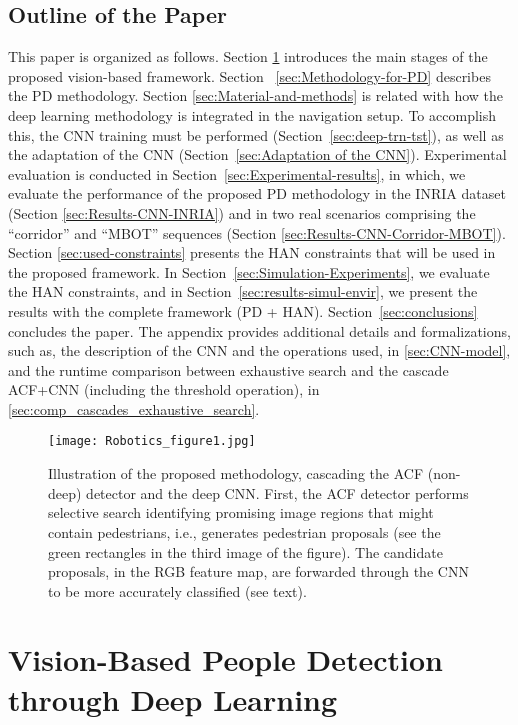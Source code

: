 \documentclass[5p,time]{elsarticle}
\begin{document}
\subsection{Outline of the Paper}

This paper is organized as follows. Section \ref{sec:localization} introduces the main stages of the proposed vision-based framework. Section ~\ref{sec:Methodology-for-PD} describes the PD methodology. Section \ref{sec:Material-and-methods} is related with how the deep learning methodology is integrated in the navigation setup. To accomplish this, the CNN training must be performed (Section~\ref{sec:deep-trn-tst}), as well as the adaptation of the CNN (Section~\ref{sec:Adaptation of the CNN}). Experimental evaluation is conducted in Section~\ref{sec:Experimental-results}, in which, we evaluate the performance of the proposed PD methodology in the INRIA dataset (Section \ref{sec:Results-CNN-INRIA}) and in two real scenarios comprising the ``corridor'' and ``MBOT'' sequences (Section \ref{sec:Results-CNN-Corridor-MBOT}). Section \ref{sec:used-constraints} presents the HAN constraints that will be used in the proposed framework. In Section~\ref{sec:Simulation-Experiments}, we evaluate the HAN constraints, and in Section~\ref{sec:results-simul-envir}, we present the results with the complete framework (PD + HAN). Section~\ref{sec:conclusions} concludes the paper. The appendix provides additional details and formalizations, such as, the description of the CNN and the operations used, in \ref{sec:CNN-model}, and the runtime comparison between exhaustive search and the cascade ACF+CNN (including the threshold operation), in \ref{sec:comp_cascades_exhaustive_search}.

\begin{figure*}[t]
	\begin{center}
		\texttt{[image: Robotics\_figure1.jpg]}
	\end{center}
	\caption{Illustration of the proposed methodology, cascading the ACF (non-deep) detector and the deep CNN. First, the ACF detector performs selective search identifying promising image regions that might contain pedestrians, i.e., generates pedestrian proposals (see the green rectangles in the third image of the figure). The candidate proposals, in the RGB feature map, are forwarded through the CNN to be more accurately classified (see text).}\label{fig:PD-proposal}
\end{figure*}

\section{Vision-Based People Detection through Deep Learning}
\label{sec:localization}
\end{document}

